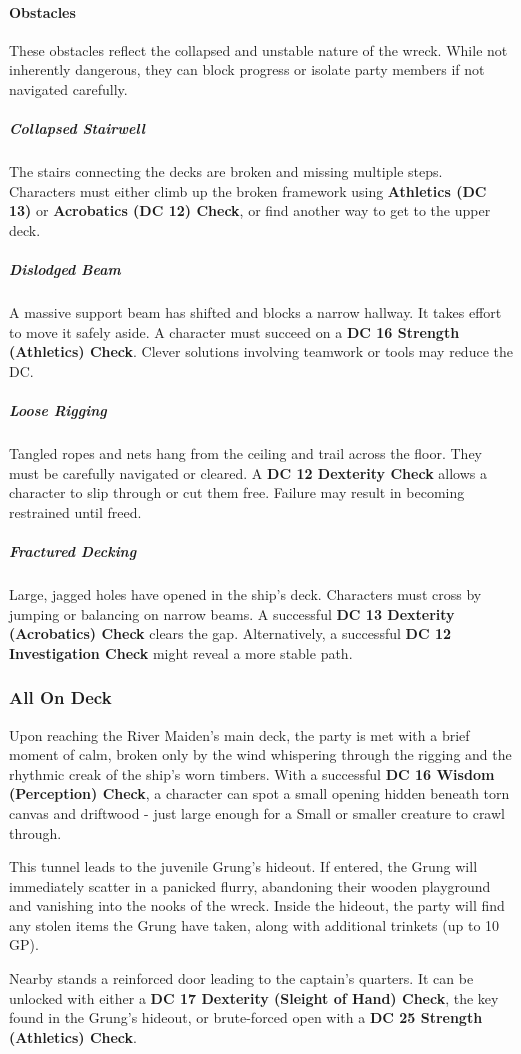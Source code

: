 {\entryfont \paragraph*{Obstacles} These obstacles reflect the collapsed and unstable nature of the wreck. While not inherently dangerous, they can block progress or isolate party members if not navigated carefully.
\subparagraph*{Collapsed Stairwell} The stairs connecting the decks are broken and missing multiple steps. Characters must either climb up the broken framework using \textbf{Athletics (DC 13)} or \textbf{Acrobatics (DC 12) Check}, or find another way to get to the upper deck.
\subparagraph*{Dislodged Beam} A massive support beam has shifted and blocks a narrow hallway. It takes effort to move it safely aside. A character must succeed on a \textbf{DC 16 Strength (Athletics) Check}. Clever solutions involving teamwork or tools may reduce the DC.
\subparagraph*{Loose Rigging} Tangled ropes and nets hang from the ceiling and trail across the floor. They must be carefully navigated or cleared. A \textbf{DC 12 Dexterity Check} allows a character to slip through or cut them free. Failure may result in becoming restrained until freed.
\subparagraph*{Fractured Decking} Large, jagged holes have opened in the ship's deck. Characters must cross by jumping or balancing on narrow beams. A successful \textbf{DC 13 Dexterity (Acrobatics) Check} clears the gap. Alternatively, a successful \textbf{DC 12 Investigation Check} might reveal a more stable path.
}

\subsubsection*{All On Deck}
{\entryfont Upon reaching the River Maiden's main deck, the party is met with a brief moment of calm, broken only by the wind whispering through the rigging and the rhythmic creak of the ship's worn timbers. With a successful \textbf{DC 16 Wisdom (Perception) Check}, a character can spot a small opening hidden beneath torn canvas and driftwood - just large enough for a Small or smaller creature to crawl through.

This tunnel leads to the juvenile Grung's hideout. If entered, the Grung will immediately scatter in a panicked flurry, abandoning their wooden playground and vanishing into the nooks of the wreck. Inside the hideout, the party will find any stolen items the Grung have taken, along with additional trinkets (up to 10 GP).

Nearby stands a reinforced door leading to the captain's quarters. It can be unlocked with either a \textbf{DC 17 Dexterity (Sleight of Hand) Check}, the key found in the Grung's hideout, or brute-forced open with a \textbf{DC 25 Strength (Athletics) Check}.}

